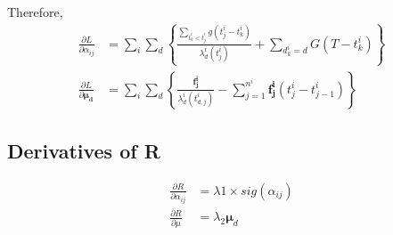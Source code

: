 \documentclass{article}
\begin{document}
			\newpage
			Therefore,
			\begin{equation}
			\begin{aligned}
			\frac{\partial L}{\partial\alpha_{ij}} &= \sum_{i} \sum_{d} \left\{\frac{\sum_{t_{k}^{i}<t_{j}^{i}} g\left(t_{j}^{i}-t_{k}^{i}\right)}{\lambda_{d}^{i}\left(t_{j}^{i}\right)} + \sum_{d^i_k = d}G\left(T - t^i_k\right) \right\} \\
			\frac{\partial L}{\partial\boldsymbol{\mu_d}} &=\sum_{i} \sum_{d}\left\{\frac{\boldsymbol{f^i_j}}{\lambda^i_d(t^i_{d,j})  }- \sum_{j=1}^{n^i} \boldsymbol{f^i_j }\left(t^i_j - t^i_{j-1}\right)  \right\}
			\end{aligned}
			\end{equation}
		
		\subsection{Derivatives of R}
			
			\begin{equation}
				\begin{aligned}
					\frac{\partial R}{\partial \alpha_{ij}} &= \lambda 1 \times sig\left(\alpha_{ij}\right) \\
					\frac{\partial R}{\partial \mu} &= \lambda_{2} \boldsymbol{\mu}_d
				\end{aligned}
			\end{equation}
			
		
\end{document}
